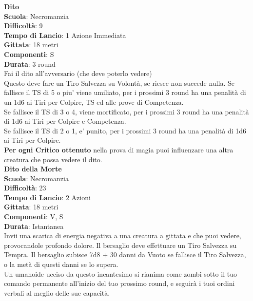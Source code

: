 \begin{multicols}{2}
\medskip\textbf{Dito}\\
\textbf{Scuola}: Necromanzia\\
\textbf{Difficoltà}:  9\\
\textbf{Tempo di Lancio}: 1 Azione Immediata\\
\textbf{Gittata}: 18 metri\\
\textbf{Componenti}: S\\
\textbf{Durata}: 3 round\\
Fai il dito all'avversario (che deve poterlo vedere)\\
Questo deve fare un Tiro Salvezza su Volontà, se riesce non succede nulla.
Se fallisce il TS di 5 o piu' viene umiliato, per i prossimi 3 round ha una penalità di un 1d6 ai Tiri per Colpire, TS ed alle prove di Competenza.\\
Se fallisce il TS di 3 o 4, viene mortificato, per i prossimi 3 round ha una penalità di 1d6 ai Tiri per Colpire e Competenza.\\
Se fallisce il TS di 2 o 1, e' punito, per i prossimi 3 round ha una penalità di 1d6 ai Tiri per Colpire.\\
\textbf{Per ogni Critico ottenuto} nella prova di magia puoi influenzare una altra creatura che possa vedere il dito.\\

\medskip\textbf{Dito della Morte}\\
\textbf{Scuola}: Necromanzia\\
\textbf{Difficoltà}:  23\\
\textbf{Tempo di Lancio}: 2 Azioni\\
\textbf{Gittata}: 18 metri\\
\textbf{Componenti}: V, S\\
\textbf{Durata}: Istantanea\\
Invii una scarica di energia negativa a una creatura a gittata e che puoi vedere, provocandole profondo dolore. Il bersaglio deve effettuare un Tiro Salvezza su Tempra. Il bersaglio subisce 7d8 + 30 danni da Vuoto se fallisce il Tiro Salvezza, o la metà di questi danni se lo supera.\\
Un umanoide ucciso da questo incantesimo si rianima come zombi sotto il tuo comando permanente all'inizio del tuo prossimo round, e seguirà i tuoi ordini verbali al meglio delle sue capacità.


\end{multicols}
